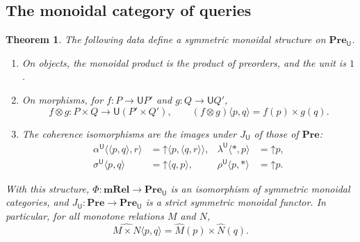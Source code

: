 \documentclass[11pt,a4paper]{article}
\theoremstyle{plain}
\newtheorem{theorem}{Theorem}[section]
\theoremstyle{definition}
\theoremstyle{remark}
\newcommand{\Cat}[1]{\mathbf{#1}}
\newcommand{\Pre}{\Cat{Pre}}
\newcommand{\mRel}{\Cat{mRel}}
\newcommand{\U}{\mathsf{U}}
\newcommand{\PreU}{\Pre_{\U}}
\newcommand{\tup}[1]{\langle #1 \rangle}
\newcommand{\up}{\mathord{\uparrow}}
\begin{document}
\subsection{The monoidal category of queries}

\begin{theorem}
    \label{thm:PreU-monoidal}
    The following data define a symmetric monoidal structure on $\PreU$.
    \begin{enumerate}
        \item On objects, the monoidal product is the product of preorders, and the unit is $1$.
        \item On morphisms, for $f \colon P \to \U P'$ and $g \colon Q \to \U Q'$,
              \begin{equation}
                  \label{eq:kleisli-product}
                  f \otimes g \colon P \times Q \to \U(P' \times Q'),
                  \qquad
                  (f \otimes g)\tup{p,q} = f(p) \times g(q).
              \end{equation}
        \item The coherence isomorphisms are the images under $J_{\U}$ of those of $\Pre$:
              \begin{equation}
                  \label{eq:kleisli-coherence}
                  \begin{aligned}
                      \alpha^{\U}\tup{\tup{p,q},r} & = \up \tup{p,\tup{q,r}}, &
                      \lambda^{\U}\tup{*,p} & = \up p, \\
                      \sigma^{\U}\tup{p,q} & = \up \tup{q,p}, &
                      \rho^{\U}\tup{p,*} & = \up p.
                  \end{aligned}
              \end{equation}
    \end{enumerate}
    With this structure, $\Phi \colon \mRel \to \PreU$ is an isomorphism of symmetric monoidal categories, and $J_{\U} \colon \Pre \to \PreU$ is a strict symmetric monoidal functor.
    In particular, for all monotone relations $M$ and $N$,
    \begin{equation}
        \label{eq:hat-product}
        \widehat{M \times N}\tup{p,q} = \widehat{M}(p) \times \widehat{N}(q).
    \end{equation}
\end{theorem}
\end{document}
